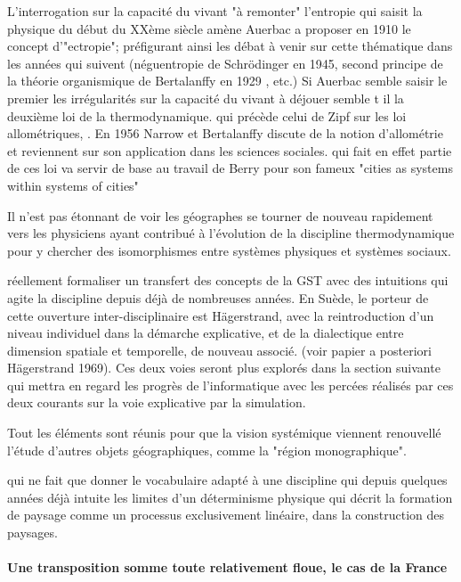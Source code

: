 {L'interrogation sur la capacité du vivant "à remonter" l'entropie qui saisit la physique du début du XXème siècle amène Auerbac a proposer en 1910 le concept d'"ectropie"; préfigurant ainsi les débat à venir sur cette thématique dans les années qui suivent (néguentropie de Schrödinger en 1945, second principe de la théorie organismique de Bertalanffy en 1929 \autocite[475]{Pouvreau2013}, etc.) \autocite[80]{Pouvreau2013} Si Auerbac semble saisir le premier les irrégularités sur la capacité du vivant à déjouer semble t il la deuxième loi de la thermodynamique. qui précède celui de Zipf sur les loi allométriques, . En 1956 Narrow et Bertalanffy discute de la notion d'allométrie et reviennent sur son application dans les sciences sociales. qui fait en effet partie de ces loi va servir de base au travail de Berry pour son fameux "cities as systems within systems of cities"

Il n'est pas étonnant de voir les géographes se tourner de nouveau rapidement vers les physiciens ayant contribué à l'évolution de la discipline thermodynamique pour y chercher des isomorphismes entre systèmes physiques et systèmes sociaux.

réellement formaliser un transfert des concepts de la GST avec des intuitions qui agite la discipline depuis déjà de nombreuses années. En Suède, le porteur de cette ouverture inter-disciplinaire est Hägerstrand, avec la reintroduction d'un niveau individuel dans la démarche explicative, et de la dialectique entre dimension spatiale et temporelle, de nouveau associé. (voir papier a posteriori Hägerstrand 1969). Ces deux voies seront plus explorés dans la section suivante qui mettra en regard les progrès de l'informatique avec les percées réalisés par ces deux courants sur la voie explicative par la simulation.

Tout les éléments sont réunis pour que la vision systémique viennent renouvellé l'étude d'autres objets géographiques, comme la "région monographique".

 qui ne fait que donner le vocabulaire adapté à une discipline qui depuis quelques années déjà intuite les limites d'un déterminisme physique qui décrit la formation de paysage comme un processus exclusivement linéaire, dans la construction des paysages.


\paragraph{Une transposition somme toute relativement floue, le cas de la France}

}
